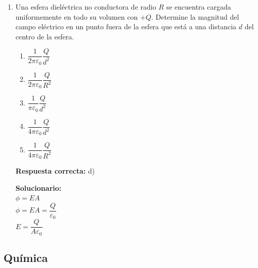 \begin{enumerate}
	\vspace{2mm}
	\textbf{Solucionario:}\\
	$Q_{\text{g Hielo}} = -Q_{\text{perdido H}_2\text{O}}$\\
	$m_{\text{Hielo}} L_f = - c_{\text{H}_2\text{O}} m_{\text{H}_2\text{O}}  AT$\\
	
	$m_{\text{H}_2\text{O}} = - \dfrac{m_{\text{Hielo}} L_f}{c_{\text{H}_2\text{O}}  AT}$\\
	
	$m_{\text{H}_2\text{O}} = - \dfrac{(40)(10\%)(80)}{(1)(0-8)} = \dfrac{(4)(80)}{8}$\\
	
	$m_{\text{H}_2\text{O}} = \fbox{40 \text{ g}}$
	
	\vspace{6mm}
	
	\item Una esfera dieléctrica no conductora de radio $R$ se encuentra cargada uniformemente en todo su volumen con $+Q$. Determine la magnitud del campo eléctrico en un punto fuera de la esfera que está a una distancia $d$ del centro de la esfera.
	\begin{enumerate}[label=\alph*)]
		\item $\dfrac{1}{2\pi\varepsilon_0} \dfrac{Q}{d^2}$
		\item $\dfrac{1}{2\pi\varepsilon_0} \dfrac{Q}{R^2}$
		\item $\dfrac{1}{\pi\varepsilon_0} \dfrac{Q}{d^2}$
		\item $\dfrac{1}{4\pi\varepsilon_0} \dfrac{Q}{d^2}$
		\item $\dfrac{1}{4\pi\varepsilon_0} \dfrac{Q}{R^2}$
	\end{enumerate}
	\textbf{Respuesta correcta:} d)
	
	\vspace{2mm}
	\textbf{Solucionario:}\\
	$\phi = E A$\\
	$\phi = E A = \dfrac{Q}{\varepsilon_0}$\\
	$E = \dfrac{Q}{A \varepsilon_0}$\\
	
	\vspace{6mm}
	
\end{enumerate}





\subsection*{Química}

